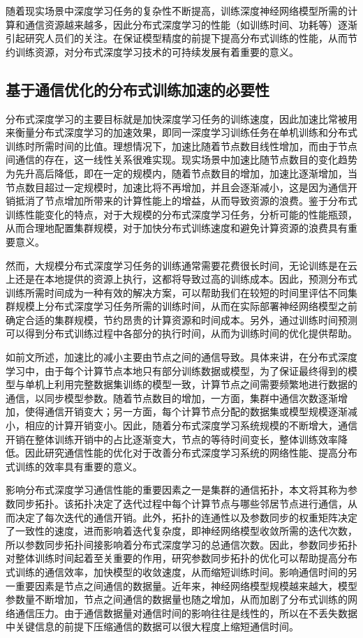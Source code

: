 随着现实场景中深度学习任务的复杂性不断提高，训练深度神经网络模型所需的计算和通信资源越来越多，因此分布式深度学习的性能（如训练时间、功耗等）逐渐引起研究人员们的关注。在保证模型精度的前提下提高分布式训练的性能，从而节约训练资源，对分布式深度学习技术的可持续发展有着重要的意义。%

\subsection{基于通信优化的分布式训练加速的必要性}

分布式深度学习的主要目标就是加快深度学习任务的训练速度，因此加速比常被用来衡量分布式深度学习的加速效果\cite{王帅2022}，即同一深度学习训练任务在单机训练和分布式训练时所需时间的比值。理想情况下，加速比随着节点数目线性增加，而由于节点间通信的存在，这一线性关系很难实现。现实场景中加速比随节点数目的变化趋势为先升高后降低，即在一定的规模内，随着节点数目的增加，加速比逐渐增加，当节点数目超过一定规模时，加速比将不再增加，并且会逐渐减小，这是因为通信开销抵消了节点增加所带来的计算性能上的增益，从而导致资源的浪费。鉴于分布式训练性能变化的特点，对于大规模的分布式深度学习任务，分析可能的性能瓶颈，从而合理地配置集群规模，对于加快分布式训练速度和避免计算资源的浪费具有重要意义。

然而，大规模分布式深度学习任务的训练通常需要花费很长时间，无论训练是在云上还是在本地提供的资源上执行，这都将导致过高的训练成本。因此，预测分布式训练所需时间成为一种有效的解决方案，可以帮助我们在较短的时间里评估不同集群规模上分布式深度学习任务所需的训练时间，从而在实际部署神经网络模型之前确定合适的集群规模，节约昂贵的计算资源和时间成本。另外，通过训练时间预测可以得到分布式训练过程中各部分的执行时间，从而为训练时间的优化提供帮助。

如前文所述，加速比的减小主要由节点之间的通信导致。具体来讲，在分布式深度学习中，由于每个计算节点本地只有部分训练数据或模型，为了保证最终得到的模型与单机上利用完整数据集训练的模型一致，计算节点之间需要频繁地进行数据的通信，以同步模型参数。随着节点数目的增加，一方面，集群中通信次数逐渐增加，使得通信开销变大；另一方面，每个计算节点分配的数据集或模型规模逐渐减小，相应的计算开销变小。因此，随着分布式深度学习系统规模的不断增大，通信开销在整体训练开销中的占比逐渐变大，节点的等待时间变长，整体训练效率降低。因此研究通信性能的优化对于改善分布式深度学习系统的网络性能、提高分布式训练的效率具有重要的意义。

影响分布式深度学习通信性能的重要因素之一是集群的通信拓扑\cite{neglia2019role, wang2021impact, nedic2018network}，本文将其称为参数同步拓扑。该拓扑决定了迭代过程中每个计算节点与哪些邻居节点进行通信，从而决定了每次迭代的通信开销。此外，拓扑的连通性以及参数同步的权重矩阵决定了一致性的速度，进而影响着迭代复杂度，即神经网络模型收敛所需的迭代次数，所以参数同步拓扑间接影响着分布式深度学习的总通信次数。因此，参数同步拓扑对整体训练时间起着至关重要的作用，研究参数同步拓扑的优化可以帮助提高分布式训练的通信效率，加快模型的收敛速度，从而缩短训练时间。影响通信时间的另一重要因素是节点之间通信的数据量。近年来，神经网络模型规模越来越大，模型参数量不断增加，节点之间通信的数据量也随之增加，从而加剧了分布式训练的网络通信压力。由于通信数据量对通信时间的影响往往是线性的，所以在不丢失数据中关键信息的前提下压缩通信的数据可以很大程度上缩短通信时间。

